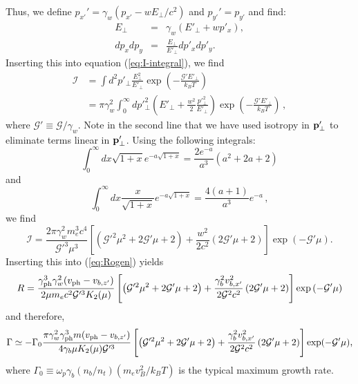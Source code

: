 \documentclass[usenatbib,iop,apj,numberedappendix]{aeb_emulateapj_2015}
\newcommand\qc[1]{{\color{red} \bf #1}}
\newcommand\bmath[1] {\mbox{\boldmath$\rm #1$}}
\def\bp{\bmath{p}}
\def\gph{\gamma_{\rm ph}}
\def\vph{v_{\rm ph}}
\def\cG{\mathcal{G}}
\newcommand{\kI}{\ensuremath{\mathcal{I}}}
\begin{document}
\begin{appendix}
Thus, we define $p_{x'}'=\gamma_w(p_{x'}-w E_\perp/c^2)$ and $p_{y'}'=p_{y'}$ and find:
\begin{eqnarray}
E_\perp &=& \gamma_w(E'_\perp + w p'_x),\\
d p_x d p_y &=& \frac{E_\perp}{E'_\perp} d p'_x d p'_y.
\end{eqnarray}
Inserting this into equation (\ref{eq:I-integral}), we find
\begin{equation}
\begin{aligned}
\kI &= 
\int d^2\!p'_\perp \frac{E_\perp^2}{E'_\perp} \exp\left(-\frac{\cG'E'_\perp}{k_B T}\right)\\
&=
\pi \gamma_w^2 \int_0^\infty dp'^2_\perp \left(
  E'_\perp + \frac{w^2}{2} \frac{p'^2_\perp}{E'_\perp}
\right) \exp\left(-\frac{\cG'E'_\perp}{k_B T}\right)\,,
\end{aligned}
\end{equation}
where $\cG'\equiv\cG/\gamma_w$. Note in the second line that we have used isotropy in $\bp_{\perp}'$ to eliminate terms linear in $\bp_{\perp}'$. 
Using the following integrals: 
\begin{equation}
\int_0^\infty dx \sqrt{1+x} e^{-a\sqrt{1+x}} = \frac{2 e^{-a}}{a^3}\left(a^2 + 2a + 2\right)
\end{equation}
and 
\begin{equation}
\int_0^\infty dx \frac{x}{\sqrt{1+x}} e^{-a\sqrt{1+x}}
=
\frac{4(a+1)}{a^3} e^{-a}\,,
\end{equation}
we find
\begin{equation}
\kI =
\frac{2 \pi \gamma_w^2 m_e^3c^4}{\cG'^3\mu^3} \left[
\left(\cG'^2\mu^2+2\cG'\mu+2\right)
+
\frac{w^2}{2c^2}
\left(2\cG'\mu+2\right)
\right]\exp\left(-\cG'\mu\right).
\end{equation}
Inserting this into (\ref{eq:Rogen}) yields
\begin{equation}
R = \frac{
  \gph^3 \gamma_w^2 (\vph-v_{b,z'}) 
}{ 2 \mu m_ec^2 \cG'^3 K_2(\mu)}
\left[
\left(\cG'^2\mu^2 + 2\cG'\mu + 2\right)
+
\frac{\gamma_b^2 v_{b,x'}^2}{2\cG^2 c^2} \left(2 \cG'\mu + 2\right)
\right] \exp\left(-\cG'\mu\right)
\end{equation}
and therefore,
\begin{equation}
\Gamma \simeq - \Gamma_0
\frac{\pi \gamma_w^2 \gph^3 m (\vph-v_{b,z'})}{4 \gamma_b \mu K_2(\mu) \cG'^3}
\left[
\left( \cG'^2\mu^2 + 2\cG'\mu + 2 \right) 
+
\frac{\gamma_b^2 v_{b,x'}^2}{2\cG^2c^2} \left(2 \cG'\mu+ 2\right)
\right]
\exp(-\cG'\mu),
\label{eq:OGgen}
\end{equation}
where $\Gamma_0 \equiv \omega_p \gamma_b (n_b/n_t) (m_e v_B^2/k_B T)$ is the typical maximum growth rate.


\end{appendix}
\end{document}
